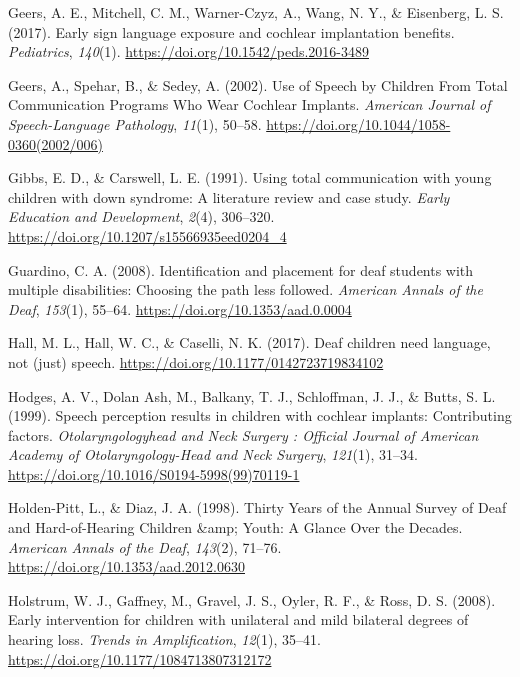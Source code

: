 \documentclass[english,man]{apa6}
\begin{document}
\leavevmode\hypertarget{ref-geers2017}{}%
Geers, A. E., Mitchell, C. M., Warner-Czyz, A., Wang, N. Y., \& Eisenberg, L. S. (2017). Early sign language exposure and cochlear implantation benefits. \emph{Pediatrics}, \emph{140}(1). \url{https://doi.org/10.1542/peds.2016-3489}

\leavevmode\hypertarget{ref-geers2002}{}%
Geers, A., Spehar, B., \& Sedey, A. (2002). Use of Speech by Children From Total Communication Programs Who Wear Cochlear Implants. \emph{American Journal of Speech-Language Pathology}, \emph{11}(1), 50--58. \url{https://doi.org/10.1044/1058-0360(2002/006)}

\leavevmode\hypertarget{ref-gibbs1991}{}%
Gibbs, E. D., \& Carswell, L. E. (1991). Using total communication with young children with down syndrome: A literature review and case study. \emph{Early Education and Development}, \emph{2}(4), 306--320. \url{https://doi.org/10.1207/s15566935eed0204_4}

\leavevmode\hypertarget{ref-guardino2008}{}%
Guardino, C. A. (2008). Identification and placement for deaf students with multiple disabilities: Choosing the path less followed. \emph{American Annals of the Deaf}, \emph{153}(1), 55--64. \url{https://doi.org/10.1353/aad.0.0004}

\leavevmode\hypertarget{ref-hall2017}{}%
Hall, M. L., Hall, W. C., \& Caselli, N. K. (2017). Deaf children need language, not (just) speech. \url{https://doi.org/10.1177/0142723719834102}

\leavevmode\hypertarget{ref-hodges1999}{}%
Hodges, A. V., Dolan Ash, M., Balkany, T. J., Schloffman, J. J., \& Butts, S. L. (1999). Speech perception results in children with cochlear implants: Contributing factors. \emph{Otolaryngologyhead and Neck Surgery : Official Journal of American Academy of Otolaryngology-Head and Neck Surgery}, \emph{121}(1), 31--34. \url{https://doi.org/10.1016/S0194-5998(99)70119-1}

\leavevmode\hypertarget{ref-holden-pitt1998}{}%
Holden-Pitt, L., \& Diaz, J. A. (1998). Thirty Years of the Annual Survey of Deaf and Hard-of-Hearing Children \&amp; Youth: A Glance Over the Decades. \emph{American Annals of the Deaf}, \emph{143}(2), 71--76. \url{https://doi.org/10.1353/aad.2012.0630}

\leavevmode\hypertarget{ref-holstrum2008}{}%
Holstrum, W. J., Gaffney, M., Gravel, J. S., Oyler, R. F., \& Ross, D. S. (2008). Early intervention for children with unilateral and mild bilateral degrees of hearing loss. \emph{Trends in Amplification}, \emph{12}(1), 35--41. \url{https://doi.org/10.1177/1084713807312172}
\end{document}
